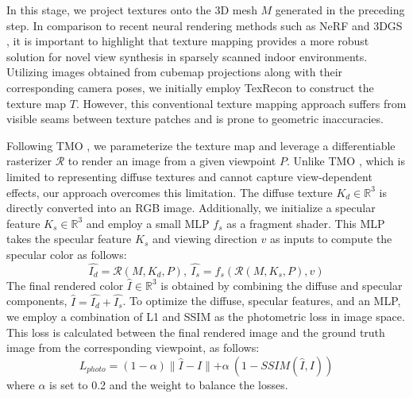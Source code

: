 In this stage, we project textures onto the 3D mesh $M$ generated in the preceding step. In comparison to recent neural rendering methods such as NeRF \cite{mildenhall2021nerf} and 3DGS \cite{kerbl20233d}, it is important to highlight that texture mapping provides a more robust solution for novel view synthesis in sparsely scanned indoor environments.
Utilizing images obtained from cubemap projections along with their corresponding camera poses, we initially employ TexRecon \cite{waechter2014TexRecon} to construct the texture map $T$. However, this conventional texture mapping approach suffers from visible seams between texture patches and is prone to geometric inaccuracies.

Following TMO \cite{choi2023tmo}, we parameterize the texture map and leverage a differentiable rasterizer $\mathcal{R}$ \cite{nvdiffrast} to render an image from a given viewpoint $P$. Unlike TMO \cite{choi2023tmo}, which is limited to representing diffuse textures and cannot capture view-dependent effects, our approach overcomes this limitation. The diffuse texture $K_{d} \in \mathbb{R}^3$ is directly converted into an RGB image. Additionally, we initialize a specular feature $K_{s} \in \mathbb{R}^3$ and employ a small MLP $f_{s}$ as a fragment shader. This MLP takes the specular feature $K_{s}$ and viewing direction $v$ as inputs to compute the specular color as follows: 
\begin{equation} \label{eq:textureupdate}
    \hat{I_{d}} = \mathcal{R}(M, K_{d}, P), ~   \hat{I_{s}} = f_{s}(\mathcal{R}(M, K_{s}, P), v) 
\end{equation}
The final rendered color $\hat{I} \in \mathbb{R}^3$ is obtained by combining the diffuse and specular components, $\hat{I} = \hat{I_{d}} + \hat{I_{s}}$. 
To optimize the diffuse, specular features, and an MLP, we employ a combination of L1 and SSIM \cite{SSIM} as the photometric loss in image space. This loss is calculated between the final rendered image and the ground truth image from the corresponding viewpoint, as follows:
\begin{equation} \label{eq:textureupdate1}
    L_{photo} = (1-\alpha)\parallel\hat{I} - I\parallel + \alpha\:(1 - SSIM(\hat{I}, I))
\end{equation}
where $\alpha$ is set to 0.2 and the weight to balance the losses.


